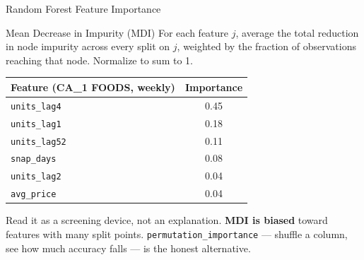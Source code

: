 \documentclass[aspectratio=169, 11pt]{beamer}
\begin{document}
\begin{frame}{Random Forest Feature Importance \parencite{Molnar2022}}
  \begin{definitionbox}{Mean Decrease in Impurity (MDI)}
    \small For each feature $j$, average the total reduction in node impurity across every
    split on $j$, weighted by the fraction of observations reaching that node. Normalize to
    sum to 1.
  \end{definitionbox}
  \begin{center}
    {\small
    \begin{tabular}{lc}
      \toprule
      \textbf{Feature (CA\_1 FOODS, weekly)} & \textbf{Importance} \\
      \midrule
      \texttt{units\_lag4}  & 0.45 \\
      \texttt{units\_lag1}  & 0.18 \\
      \texttt{units\_lag52} & 0.11 \\
      \texttt{snap\_days}   & 0.08 \\
      \texttt{units\_lag2}  & 0.04 \\
      \texttt{avg\_price}   & 0.04 \\
      \bottomrule
    \end{tabular}
    }
  \end{center}

  Read it as a screening device, not an explanation. \textbf{MDI is biased} toward features
  with many split points. \texttt{permutation\_importance} --- shuffle a column, see how much
  accuracy falls --- is the honest alternative.
\end{frame}
\end{document}

